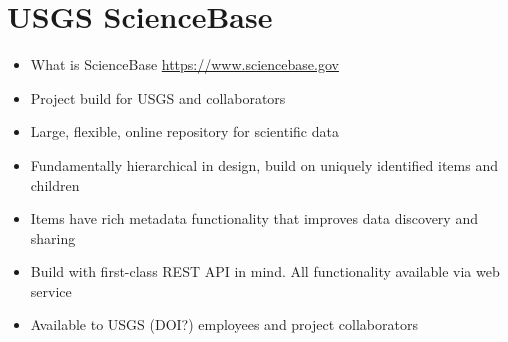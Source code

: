 \section{USGS ScienceBase}

\begin{itemize}
	\item{What is ScienceBase \url{https://www.sciencebase.gov}}
	\item{Project build for USGS and collaborators}
	\item{Large, flexible, online repository for scientific data}
	\item{Fundamentally hierarchical in design, build on uniquely identified items and children}
	\item{Items have rich metadata functionality that improves data discovery and sharing}
	\item{Build with first-class REST API in mind. All functionality available via web service}
	\item{Available to USGS (DOI?) employees and project collaborators}
\end{itemize}
